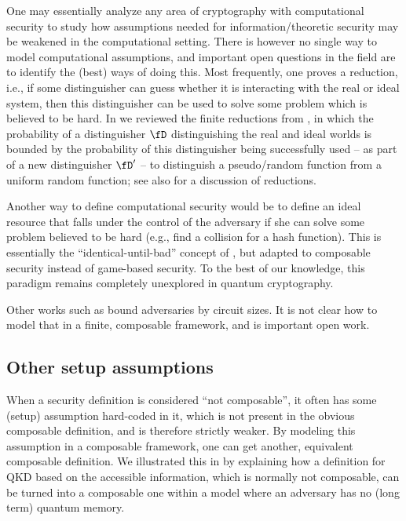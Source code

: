 One may essentially analyze any area of cryptography with
computational security to study how assumptions needed for
information\-/theoretic security may be weakened in the computational
setting. There is however no single way to model computational
assumptions, and important open questions in the field are to identify
the (best) ways of doing this. Most frequently, one proves a
reduction, i.e., if some distinguisher can guess whether it is
interacting with the real or ideal system, then this distinguisher can
be used to solve some problem which is believed to be hard. In
 we reviewed the finite reductions from
\textcite{BMPZ19}, in which the probability of a distinguisher $\fD$
distinguishing the real and ideal worlds is bounded by the probability
of this distinguisher being successfully used \--- as part of a new
distinguisher $\fD'$ \--- to distinguish a pseudo\-/random function
from a uniform random function; see also \textcite{Rog06} for a
discussion of reductions.

Another way to define computational security would be to define an
ideal resource that falls under the control of the adversary if she
can solve some problem believed to be hard (e.g., find a collision for
a hash function). This is essentially the ``identical-until-bad''
concept of \textcite{BR06}, but adapted to composable security instead of
game-based security. To the best of our knowledge, this paradigm remains
completely unexplored in quantum cryptography.

Other works such as \textcite{CCLVW17} bound adversaries by
circuit sizes. It is not clear how to model that in a finite,
composable framework, and is important open work.



\subsection{Other setup assumptions}
\label{sec:open.other}

When a security definition is considered ``not composable'', it often
has some (setup) assumption hard-coded in it, which is not present in
the obvious composable definition, and is therefore strictly
weaker. By modeling this assumption in a composable framework, one can
get another, equivalent composable definition. We illustrated this
in  by explaining how a definition for QKD based on the accessible information, which is normally not composable, can be turned into a composable
one within a model where an adversary has no (long term) quantum
memory.

